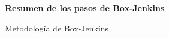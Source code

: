 \begin{figure}[h]
	\centering
	\textbf{Resumen de los pasos de Box-Jenkins}\par\medskip
	\caption{Metodología de Box-Jenkins}\label{fig30}
\end{figure}

%


